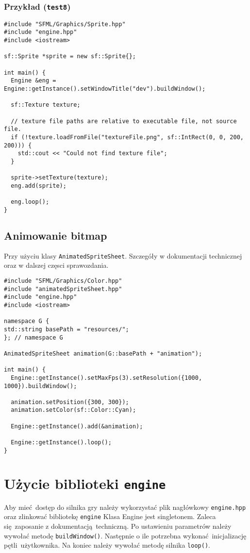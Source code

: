 \documentclass[11pt]{article}
\begin{document}
\subsubsection{Przykład (\texttt{test8})}
\label{sec:orgf9b84c6}

\begin{verbatim}
#include "SFML/Graphics/Sprite.hpp"
#include "engine.hpp"
#include <iostream>

sf::Sprite *sprite = new sf::Sprite{};

int main() {
  Engine &eng = Engine::getInstance().setWindowTitle("dev").buildWindow();

  sf::Texture texture;

  // texture file paths are relative to executable file, not source file.
  if (!texture.loadFromFile("textureFile.png", sf::IntRect(0, 0, 200, 200))) {
    std::cout << "Could not find texture file";
  }

  sprite->setTexture(texture);
  eng.add(sprite);

  eng.loop();
}
\end{verbatim}
\subsection{Animowanie bitmap}
\label{sec:org6a5bec1}
Przy użyciu klasy \texttt{AnimatedSpriteSheet}. Szczegóły w dokumentacji technicznej oraz w dalszej częsci sprawozdania.

\begin{verbatim}
#include "SFML/Graphics/Color.hpp"
#include "animatedSpriteSheet.hpp"
#include "engine.hpp"
#include <iostream>

namespace G {
std::string basePath = "resources/";
}; // namespace G

AnimatedSpriteSheet animation(G::basePath + "animation");

int main() {
  Engine::getInstance().setMaxFps(3).setResolution({1000, 1000}).buildWindow();

  animation.setPosition({300, 300});
  animation.setColor(sf::Color::Cyan);

  Engine::getInstance().add(&animation);

  Engine::getInstance().loop();
}
\end{verbatim}
\section{Użycie biblioteki \texttt{engine}}
\label{sec:org9f8e8c1}
Aby mieć dostęp do silnika gry należy wykorzystać plik nagłówkowy \texttt{engine.hpp} oraz zlinkować bibliotekę \texttt{engine}
Klasa Engine jest singletonem.
Zaleca się zaposanie z dokumentacją techniczną.
Po ustawieniu parametrów należy wywołać metodę \texttt{buildWindow()}.
Następnie o ile potrzebna wykonać inicjalizację pętli użytkownika.
Na koniec należy wywołać metodę silnika \texttt{loop()}.
\end{document}
